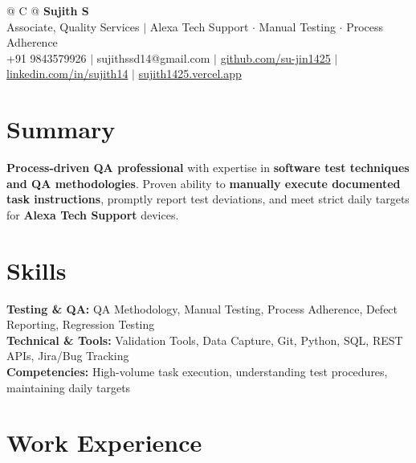 \documentclass[a4paper,11pt]{article}
\newcommand{\ulink}[2]{\href{#1}{#2}}
\begin{document}
\pagestyle{empty}

\begin{tabularx}{\linewidth}{@{} C @{}}
{\color[HTML]{000000}\fontsize{30}{35}\selectfont\bfseries Sujith S} \\[5pt]
{\fontsize{10.5}{12.5}\selectfont\color[HTML]{3A3A3A}
Associate, Quality Services $|$ Alexa Tech Support $\cdot$ Manual Testing $\cdot$ Process Adherence} \\[6pt]
{\fontsize{9.5}{11.5}\selectfont\textcolor[HTML]{3A3A3A}{+91 9843579926 $|$ sujithssd14@gmail.com $|$ \ulink{https://github.com/su-jin1425}{github.com/su-jin1425} $|$ \ulink{https://linkedin.com/in/sujith14}{linkedin.com/in/sujith14} $|$ \ulink{https://sujith1425.vercel.app}{sujith1425.vercel.app}}}
\end{tabularx}

\section{Summary}
\vspace{2pt}

{\color[HTML]{0A0A0A}\fontsize{11}{14}\selectfont
\textbf{Process-driven QA professional} with expertise in \textbf{software test techniques and QA methodologies}. Proven ability to \textbf{manually execute documented task instructions}, promptly report test deviations, and meet strict daily targets for \textbf{Alexa Tech Support} devices.}

\section{Skills}
\vspace{2pt}

{\color[HTML]{0A0A0A}\fontsize{11}{14}\selectfont
\textbf{Testing \& QA:} QA Methodology, Manual Testing, Process Adherence, Defect Reporting, Regression Testing \\[2pt]
\textbf{Technical \& Tools:} Validation Tools, Data Capture, Git, Python, SQL, REST APIs, Jira/Bug Tracking \\[2pt]
\textbf{Competencies:} High-volume task execution, understanding test procedures, maintaining daily targets}

\section{Work Experience}
\vspace{2pt}
\end{document}
